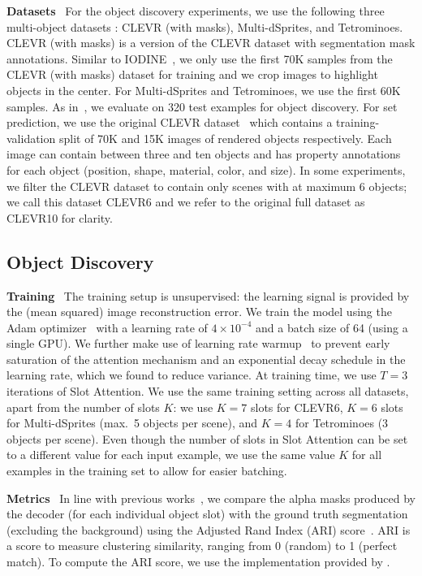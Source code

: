 \documentclass{article}
\begin{document}
\textbf{Datasets} \
For the object discovery experiments, we use the following three multi-object datasets \citep{multiobjectdatasets19}: CLEVR (with masks), Multi-dSprites, and Tetrominoes. CLEVR (with masks) is a version of the CLEVR dataset with segmentation mask annotations. Similar to IODINE~\citep{greff2019multi}, we only use the first 70K samples from the CLEVR (with masks) dataset for training and we crop images to highlight objects in the center. For Multi-dSprites and Tetrominoes, we use the first 60K samples. As in~\citep{greff2019multi}, we evaluate on 320 test examples for object discovery.
For set prediction, we use the original CLEVR dataset~\citep{johnson2017clevr} which contains a training-validation split of 70K and 15K images of rendered objects respectively. Each image can contain between three and ten objects and has property annotations for each object (position, shape, material, color, and size).
In some experiments, we filter the CLEVR dataset to contain only scenes with at maximum 6 objects; we call this dataset CLEVR6 and we refer to the original full dataset as CLEVR10 for clarity.

\subsection{Object Discovery}\label{sec:exp_obj_disc}
\textbf{Training} \
The training setup is unsupervised: the learning signal is provided by the (mean squared) image reconstruction error.
We train the model using the Adam optimizer~\citep{kingma2014adam} with a learning rate of $4\times10^{-4}$ and a batch size of 64 (using a single GPU). We further make use of learning rate warmup~\citep{goyal2017accurate} to prevent early saturation of the attention mechanism and an exponential decay schedule in the learning rate, which we found to reduce variance. At training time, we use $T=3$ iterations of Slot Attention. We use the same training setting across all datasets, apart from the number of slots $K$: we use $K=7$ slots for CLEVR6, $K=6$ slots for Multi-dSprites (max.~5 objects per scene), and $K=4$ for Tetrominoes (3 objects per scene). Even though the number of slots in Slot Attention can be set to a different value for each input example, we use the same value $K$ for all examples in the training set to allow for easier batching.

\textbf{Metrics} \
In line with previous works~\citep{greff2019multi,burgess2019monet}, we compare the alpha masks produced by the decoder (for each individual object slot) with the ground truth segmentation (excluding the background) using the Adjusted Rand Index (ARI) score~\citep{rand1971objective,hubert1985comparing}. ARI is a score to measure clustering similarity, ranging from 0 (random) to 1 (perfect match). To compute the ARI score, we use the implementation provided by \citet{multiobjectdatasets19}.
\end{document}
